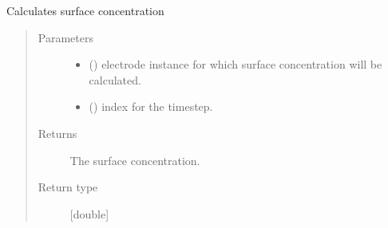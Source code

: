 \documentclass[letterpaper,10pt,english]{sphinxmanual}
\begin{document}
\begin{fulllineitems}
\label{\detokenize{solver:solver.calculate_surface_concentration}}
\sphinxAtStartPar
Calculates surface concentration
\begin{quote}\begin{description}
\item[{Parameters}] \leavevmode\begin{itemize}
\item {} 
\sphinxAtStartPar
{} (\sphinxstyleliteralemphasis{\sphinxupquote{{[}}}\sphinxstyleliteralemphasis{\sphinxupquote{{]}}}) \textendash{} electrode instance for which surface concentration will be calculated.

\item {} 
\sphinxAtStartPar
{} (\sphinxstyleliteralemphasis{\sphinxupquote{{[}}}\sphinxstyleliteralemphasis{\sphinxupquote{{]}}}) \textendash{} index for the timestep.

\end{itemize}

\item[{Returns}] \leavevmode
\sphinxAtStartPar
The surface concentration.

\item[{Return type}] \leavevmode
\sphinxAtStartPar
{[}double{]}

\end{description}\end{quote}

\end{fulllineitems}

\end{document}
